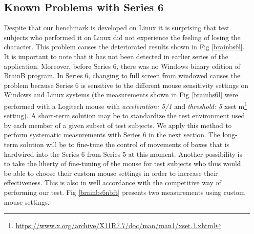 \documentclass[a4paper]{article}
\begin{document}


\subsection{Known Problems with Series 6}

Despite that our benchmark is developed on Linux it is surprising that test subjects who performed it on Linux did not experience the feeling of losing the character. This problem causes the deteriorated results shown in Fig \ref{brainbs6l}. It is important to note that it has not been detected in earlier series of the application. Moreover, before Series 6, there was no Windows binary edition of BrainB program. In Series 6, changing to full screen from windowed causes the problem because Series 6  is sensitive to the different mouse sensitivity settings on Windows and Linux systems (the measurements shown in Fig  \ref{brainbs6l} were performed with a Logitech mouse with \textit{acceleration:  5/1} and \textit{threshold:  5} xset m\footnote{\url{https://www.x.org/archive/X11R7.7/doc/man/man1/xset.1.xhtml}} setting). 
A short-term solution may be to standardize the test environment used by each member 
of a given subset of test subjects. We apply this method to perform systematic measurements with Series 6 in the next section. The long-term solution will be to fine-tune the control of movements of boxes that is hardwired into the Series 6 from Series 5 at this moment.
Another possibility is to take the liberty of fine-tuning of the mouse for test subjects who thus would be able to choose their custom mouse settings in order to increase their effectiveness. This is also in well accordance with the competitive way of performing our test.  Fig \ref{brainbs6nbft} presents two measurements using custom mouse settings.
\end{document}
